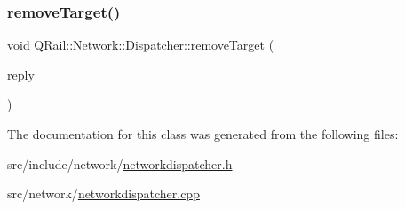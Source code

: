\mbox{\label{classQRail_1_1Network_1_1Dispatcher_a5733f3e85bac53d7c480787ba8d0a350}} 
\subsubsection{\texorpdfstring{removeTarget()}{removeTarget()}}
{\footnotesize\ttfamily void Q\+Rail\+::\+Network\+::\+Dispatcher\+::remove\+Target (\begin{DoxyParamCaption}\item[{Q\+Network\+Reply $\ast$}]{reply }\end{DoxyParamCaption})}



The documentation for this class was generated from the following files\+:\begin{DoxyCompactItemize}
\item 
src/include/network/\mbox{\hyperlink{networkdispatcher_8h}{networkdispatcher.\+h}}\item 
src/network/\mbox{\hyperlink{networkdispatcher_8cpp}{networkdispatcher.\+cpp}}\end{DoxyCompactItemize}
